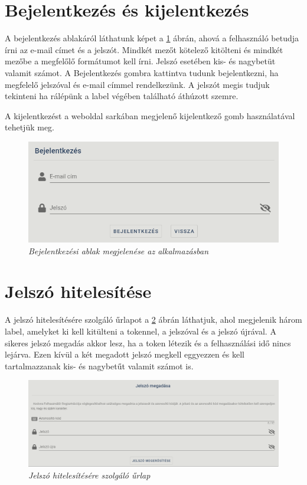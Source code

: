 \section{Bejelentkezés és kijelentkezés}

A bejelentkezés ablakáról láthatunk képet a \ref{fig:loginWindow} ábrán, ahová a felhasználó betudja írni az e-mail címet és a jelszót. Mindkét mezőt kötelező kitölteni és mindkét mezőbe a megfelőlő formátumot kell írni. Jelszó esetében kis- és nagybetüt valamit számot. A Bejelentkezés gombra kattintva tudunk bejelentkezni, ha megfelelő jelszóval és e-mail címmel rendelkezünk. A jelszót megis tudjuk tekinteni ha rálépünk a label végében található áthúzott szemre. 

A kijelentkezést a weboldal sarkában megjelenő kijelentkező gomb használatával tehetjük meg.
\begin{figure}[H]
	\centering
	\includegraphics[width=0.7\linewidth]{figures/images/bejelentkezesKep.png}
	\caption[Bejelentkezési ablak megjelenése az alkalmazásban]{\textit{Bejelentkezési ablak megjelenése az alkalmazásban}}
	\label{fig:loginWindow}
\end{figure}

\section{Jelszó hitelesítése}
A jelszó hitelesítésére szolgáló űrlapot a \ref{fig:jelszoHit} ábrán láthatjuk, ahol megjelenik három label, amelyket ki kell kitülteni a tokennel, a jelszóval és a jelszó újrával. A sikeres jelszó megadás akkor lesz, ha a token létezik és a felhasználási idő nincs lejárva. Ezen kívül a két megadott jelszó megkell eggyezzen és kell tartalmazzanak kis- és nagybetűt valamit számot is.
\begin{figure}[H]
	\centering
	\includegraphics[width=0.7\linewidth]{figures/images/jelszoHit.png}
	\caption[Jelszó hitelesítésére szolgáló űrlap]{\textit{Jelszó hitelesítésére szolgáló űrlap}}
	\label{fig:jelszoHit}
\end{figure}

